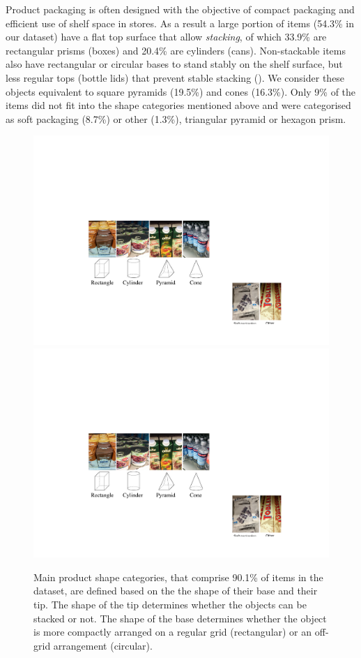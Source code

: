 Product packaging is often designed with the objective of compact packaging and efficient use of shelf space in stores.
As a result a large portion of items (54.3\% in our dataset) have a flat top surface that allow {\em stacking}, of which 33.9\% are rectangular prisms (\ie boxes) and 20.4\% are cylinders (\ie cans). 
Non-stackable items also have rectangular or circular bases to stand stably on the shelf surface, but less regular tops (\eg bottle lids) that prevent stable stacking ().
We consider these objects equivalent to square pyramids (19.5\%) and cones (16.3\%).
Only 9\% of the items did not fit into the shape categories mentioned above and were categorised as soft packaging (8.7\%) or other (1.3\%), \eg triangular pyramid or hexagon prism.

\begin{figure}[h]
	\centering      
	\includegraphics[width=0.6\linewidth]{figures/typespictures}
	\includegraphics[width=0.6\linewidth]{figures/types}
	\caption{Main product shape categories, that comprise 90.1\% of items in the dataset, are defined based on the the shape of their base and their tip. The shape of the tip determines whether the objects can be stacked or not. The shape of the base determines whether the object is more compactly arranged on a regular grid (rectangular) or an off-grid arrangement (circular).}
	\label{fig:types}
\end{figure}

